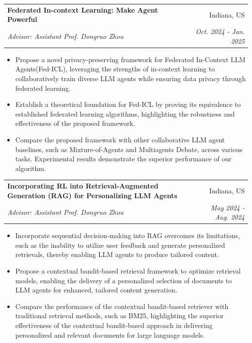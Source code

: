 \documentclass[letterpaper,10.8pt]{article}
\makeatletter
\newcommand{\resumeSubheading}[4]{
  \vspace{-1pt}\item
    \begin{tabular*}{0.97\textwidth}{l@{\extracolsep{\fill}}r}
      \textbf{#1} & #2 \\
      \textit{\small#3} & \textit{\small #4} \\
    \end{tabular*}\vspace{-5pt}
}
\makeatother
\begin{document}
\resumeSubheading
{Federated In-context Learning: Make Agent Powerful}{Indiana, US}
{Advisor: Assistant Prof. Dongruo Zhou}{Oct. 2024 - Jan. 2025}
\begin{itemize}[label=$\circ$,leftmargin=0.15in]
\setlength\itemsep{-0.1em}
\item Propose a novel privacy-preserving framework for Federated In-Context LLM Agents(Fed-ICL), leveraging the strengths of in-context learning to collaboratively train diverse LLM agents while ensuring data privacy through federated learning.
\item Establish a theoretical foundation for Fed-ICL by proving its equivalence to established federated learning algorithms, highlighting the robustness and effectiveness of the proposed framework.
\item Compare the proposed framework with other collaborative LLM agent baselines, such as Mixture-of-Agents and Multiagents Debate, across various tasks. Experimental results demonstrate the superior performance of our algorithm.
\end{itemize}


\resumeSubheading
{Incorporating RL into Retrieval-Augmented Generation (RAG) for Personalizing LLM Agents}{Indiana, US}
{Advisor: Assistant Prof. Dongruo Zhou}{May 2024 - Aug. 2024}
\begin{itemize}[label=$\circ$,leftmargin=0.15in]
\setlength\itemsep{-0.1em}
\item Incorporate sequential decision-making into RAG overcomes its limitations, such as the inability to utilize user feedback and generate personalized retrievals, thereby enabling LLM agents to produce tailored content.
\item Propose a contextual bandit-based retrieval framework to optimize retrieval models, enabling the delivery of a personalized selection of documents to LLM agents for enhanced, tailored content generation.
\item Compare the performance of the contextual bandit-based retriever with traditional retrieval methods, such as BM25, highlighting the superior effectiveness of the contextual bandit-based approach in delivering personalized and relevant documents for large language models.
\end{itemize}
\end{document}

